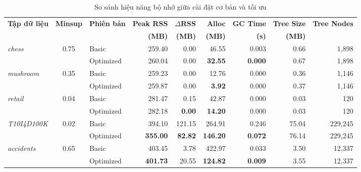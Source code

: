 \documentclass[conference]{IEEEtran}
\begin{document}
\begin{table}[htbp]
    \centering
    \caption{So sánh hiệu năng bộ nhớ giữa cài đặt cơ bản và tối ưu}
    \label{tab:memory_eval}
    \vspace{0.2cm}
    \renewcommand{\arraystretch}{1.25}
    \begin{tabular}{|l|c|l|r|r|r|r|r|r|}
        \hline
        \textbf{Tập dữ liệu} & \textbf{Minsup} & \textbf{Phiên bản} & \textbf{Peak RSS} & \textbf{$\Delta$RSS} & \textbf{Alloc} & \textbf{GC Time} & \textbf{Tree Size} & \textbf{Tree Nodes} \\
        & & & \textbf{(MB)} & \textbf{(MB)} & \textbf{(MB)} & \textbf{(s)} & \textbf{(MB)} & \\ \hline
        \multirow{2}{*}{\textit{chess}} & \multirow{2}{*}{0.75} & Basic & 259.40 & 0.00 & 46.55 & 0.003 & 0.66 & 1,898 \\
        & & Optimized & 260.04 & 0.00 & \textbf{32.55} & \textbf{0.000} & 0.67 & 1,898 \\ \hline
        \multirow{2}{*}{\textit{mushroom}} & \multirow{2}{*}{0.35} & Basic & 259.23 & 0.00 & 12.76 & 0.000 & 0.36 & 1,146 \\
        & & Optimized & 259.87 & 0.00 & \textbf{3.92} & 0.000 & 0.37 & 1,146 \\ \hline
        \multirow{2}{*}{\textit{retail}} & \multirow{2}{*}{0.04} & Basic & 281.47 & 0.15 & 42.87 & 0.000 & 0.03 & 120 \\
        & & Optimized & 282.18 & \textbf{0.00} & \textbf{14.20} & 0.000 & 0.03 & 120 \\ \hline
        \multirow{2}{*}{\textit{T10I4D100K}} & \multirow{2}{*}{0.02} & Basic & 394.10 & 121.15 & 264.91 & 0.246 & 75.04 & 229,245 \\
        & & Optimized & \textbf{355.00} & \textbf{82.82} & \textbf{146.20} & \textbf{0.072} & 76.14 & 229,245 \\ \hline
        \multirow{2}{*}{\textit{accidents}} & \multirow{2}{*}{0.65} & Basic & 403.45 & 3.78 & 422.97 & 0.033 & 3.50 & 12,337 \\
        & & Optimized & \textbf{401.73} & 20.55 & \textbf{124.82} & \textbf{0.009} & 3.55 & 12,337 \\ \hline
    \end{tabular}
\end{table}
\end{document}
